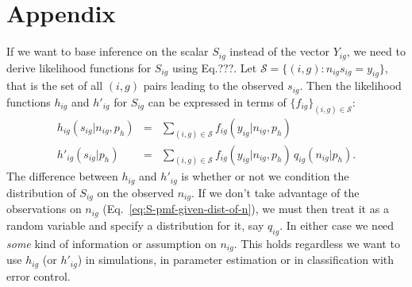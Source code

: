 \documentclass[letterpaper]{article}
\begin{document}
\section{Appendix}
\label{sec:appendix}

If we want to base inference on the scalar \(S_{ig}\) instead of the vector
\(Y_{ig}\), we need to derive likelihood functions for \(S_{ig}\) using
Eq.???.
Let \(\mathcal{S} = \{(i,g) : n_{ig} s_{ig} = y_{ig}\}\), that is the set of
all \((i,g)\) pairs leading to the observed \(s_{ig}\).  Then the likelihood
functions \(h_{ig}\) and \(h'_{ig}\) for \(S_{ig}\) can be expressed in terms
of \(\{f_{ig}\}_{(i,g)\in\mathcal{S}}\):
\begin{eqnarray}
\label{eq:S-pmf-given-n}
h_{ig}(s_{ig} | n_{ig}, p_h) &=& \sum_{(i,g)\in\mathcal{S}} f_{ig}(y_{ig} | n_{ig}, p_h)
\\
\label{eq:S-pmf-given-dist-of-n}
h'_{ig}(s_{ig} | p_h) &=& \sum_{(i,g)\in\mathcal{S}} f_{ig}(y_{ig} | n_{ig},
p_h) \, q_{ig}(n_{ig}|p_h).
\end{eqnarray}
The difference between \(h_{ig}\) and \(h'_{ig}\) is whether or not we
condition the distribution of \(S_{ig}\) on the observed \(n_{ig}\).  If we
don't take advantage of the observations on \(n_{ig}\) (Eq.~\ref{eq:S-pmf-given-dist-of-n}), we
must then treat it as a random variable and specify a distribution for it, say
\(q_{ig}\). In either case we need \emph{some} kind of information or
assumption on
\(n_{ig}\).  This holds regardless we want to use \(h_{ig}\) (or \(h'_{ig}\))
in simulations, in parameter estimation or in classification with error
control.
\end{document}
